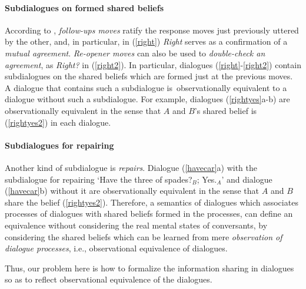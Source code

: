 \paragraph{Subdialogues on formed shared beliefs} 
According to \cite{Ste94}, {\it follow-ups moves} ratify the response moves just previously uttered by the other, and, in particular, in (\ref{right}) {\it Right} serves as a confirmation of a {\it mutual agreement}.
{\it Re-opener moves} can also be used to {\it double-check an agreement}, as {\it Right?} in (\ref{right2}).
In particular, dialogues (\ref{right}-\ref{right2}) contain subdialogues on the shared beliefs which are formed just at the previous moves.
A dialogue that contains such a subdialogue \mbox{is observationally} equivalent to a dialogue without such a subdialogue.
For example, dialogues (\ref{rightyes}a-b) are observationally equivalent in the sense that $A$ and $B$'s shared belief is (\ref{rightyes2}) in each dialogue.
\paragraph{Subdialogues for repairing}
Another kind of subdialogue is {\it repairs}.
Dialogue (\ref{havecar}a) with the subdialogue for repairing `Have the three of spades?$_B$; Yes.$_A$' and dialogue (\ref{havecar}b) without it are observationally equivalent in the sense that $A$ and $B$ share the belief (\ref{rightyes2}).
Therefore, a semantics of dialogues which associates processes of dialogues with shared beliefs formed in the processes, 
can define an equivalence without considering the real mental states of conversants, 
by considering the shared beliefs which can be learned from mere {\it observation of dialogue processes}, i.e., observational equivalence of dialogues.
\par
Thus, our problem here is how to formalize the information sharing in dialogues so as to reflect observational equivalence of the dialogues.
